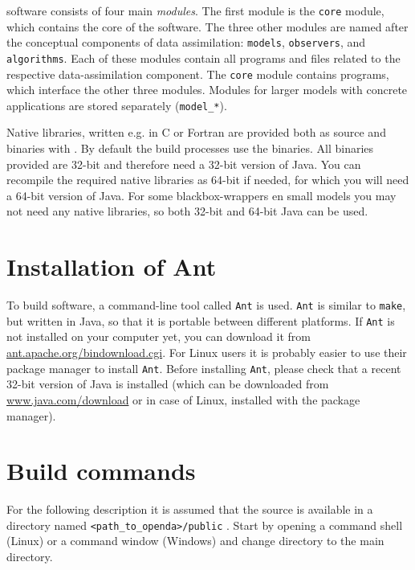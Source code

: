\oda software consists of four main \emph{modules}. The first module is the \verb|core| module, which contains the core of the \oda software. The three other modules are named after the conceptual components of data assimilation: \verb|models|, \verb|observers|, and \verb|algorithms|. Each of these modules contain all programs and files related to the respective data-assimilation component. The \verb|core| module contains programs, which interface the other three modules. Modules for larger models with concrete applications are stored separately (\verb|model_*|).

Native libraries, written e.g. in C or Fortran are provided both as source and binaries with \oda. By default the build processes use the binaries. All binaries provided are 32-bit and therefore need a 32-bit version of Java. You can recompile the required native libraries as 64-bit if needed, for which you will need a 64-bit version of Java. For some blackbox-wrappers en small models you may not need any native libraries, so both 32-bit and 64-bit Java can be used.

\section{Installation of Ant}
To build \oda software, a command-line tool called \verb|Ant| is used. \verb|Ant| is similar to \verb|make|, but written in Java, so that it is portable between different platforms. If \verb|Ant| is not installed on your computer yet, you can download it from \href{http://ant.apache.org/bindownload.cgi}{ant.apache.org/bindownload.cgi}. For Linux users it is probably easier to use their package manager to install \verb|Ant|. Before installing \verb|Ant|, please check that a recent 32-bit version of Java is installed (which can be downloaded from \href{http://www.java.com/download}{www.java.com/download} or in case of Linux, installed with the package manager).

\section{Build commands}
For the following description it is assumed that the \oda source is available in a directory named \verb|<path_to_openda>/public| .
Start by opening a command shell (Linux) or a command window (Windows) and change directory to the \oda main directory.

